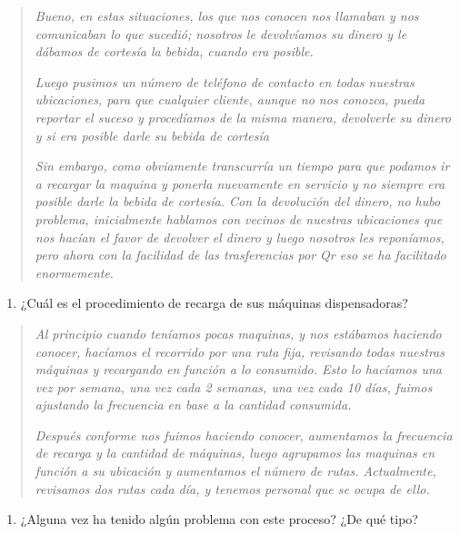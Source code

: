 \begin{quote}
\emph{Bueno, en estas situaciones, los que nos conocen nos llamaban y nos comunicaban lo que sucedió; nosotros le devolvíamos su dinero y le dábamos de cortesía la bebida, cuando era posible.}

\emph{Luego pusimos un número de teléfono de contacto en todas nuestras ubicaciones, para que cualquier cliente, aunque no nos conozca, pueda reportar el suceso y procedíamos de la misma manera, devolverle su dinero y si era posible darle su bebida de cortesía}

\emph{Sin embargo, como obviamente transcurría un tiempo para que podamos ir a recargar la maquina y ponerla nuevamente en servicio y no siempre era posible darle la bebida de cortesía. Con la devolución del dinero, no hubo problema, inicialmente hablamos con vecinos de nuestras ubicaciones que nos hacían el favor de devolver el dinero y luego nosotros les reponíamos, pero ahora con la facilidad de las trasferencias por Qr eso se ha facilitado enormemente}.
\end{quote}

\begin{enumerate}
\def\labelenumi{\arabic{enumi}.}
\setcounter{enumi}{7}
\item
  ¿Cuál es el procedimiento de recarga de sus máquinas dispensadoras?
\end{enumerate}

\begin{quote}
\emph{Al principio cuando teníamos pocas maquinas, y nos estábamos haciendo conocer, hacíamos el recorrido por una ruta fija, revisando todas nuestras máquinas y recargando en función a lo consumido. Esto lo hacíamos una vez por semana, una vez cada 2 semanas, una vez cada 10 días, fuimos ajustando la frecuencia en base a la cantidad consumida.}

\emph{Después conforme nos fuimos haciendo conocer, aumentamos la frecuencia de recarga y la cantidad de máquinas, luego agrupamos las maquinas en función a su ubicación y aumentamos el número de rutas. Actualmente, revisamos dos rutas cada día, y tenemos personal que se ocupa de ello.}
\end{quote}

\begin{enumerate}
\def\labelenumi{\arabic{enumi}.}
\setcounter{enumi}{8}
\item
  ¿Alguna vez ha tenido algún problema con este proceso? ¿De qué tipo?
\end{enumerate}

